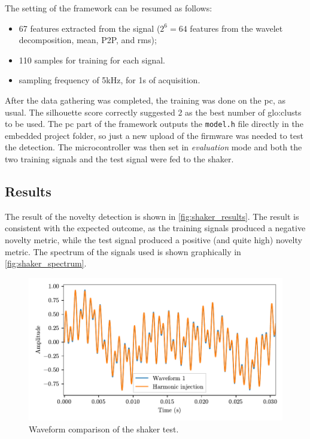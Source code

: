 The setting of the framework can be resumed as follows:
\begin{itemize}
    \item 67 features extracted from the signal ($2^6=64$ features from the wavelet decomposition, mean, P2P, and \gls{rms});
    \item 110 samples for training for each signal.
    \item sampling frequency of 5kHz, for 1s of acquisition.
\end{itemize}

After the data gathering was completed, the training was done on the \gls{pc}, as usual. The silhouette score correctly suggested 2 as the best number of \gls{glo:clust}s to be used. The \gls{pc} part of the framework outputs the \texttt{model.h} file directly in the embedded project folder, so just a new upload of the firmware was needed to test the detection. The microcontroller was then set in \emph{evaluation} mode and both the two training signals and the test signal were fed to the shaker. 

\subsection{Results}
The result of the novelty detection is shown in \autoref{fig:shaker_results}. The result is consistent with the expected outcome, as the training signals produced a negative novelty metric, while the test signal produced a positive (and quite high) novelty metric. The spectrum of the signals used is shown graphically in \autoref{fig:shaker_spectrum}.

\begin{figure}
    \centering
    \includegraphics{Images/shaker/Figure_1.pdf}
    \caption{Waveform comparison of the shaker test.}
    \label{fig:shaker}
\end{figure}

